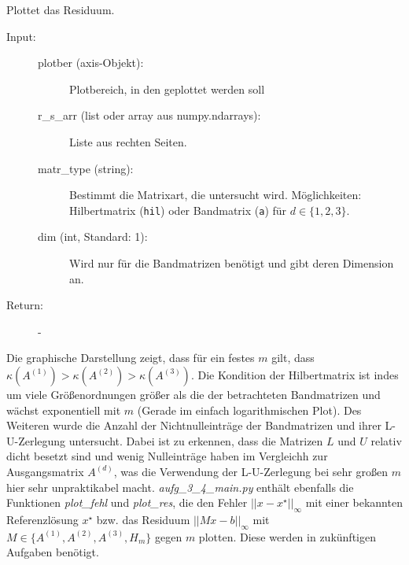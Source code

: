 \documentclass[letterpaper,10pt,ngerman, oneside, openright]{sphinxmanual}
\begin{document}

\begin{fulllineitems}
\label{\detokenize{index:aufg_3_4_main.plot_res}}
Plottet das  Residuum.
\begin{description}
\item[{Input:}] \leavevmode\begin{description}
\item[{plotber (axis-Objekt):}] \leavevmode
Plotbereich, in den geplottet werden soll

\item[{r\_s\_arr (list oder array aus numpy.ndarrays):}] \leavevmode
Liste aus rechten Seiten.

\item[{matr\_type (string):}] \leavevmode
Bestimmt die Matrixart, die untersucht wird.
Möglichkeiten: Hilbertmatrix (\texttt{hil}) oder
Bandmatrix (\texttt{a}) für $d\in\{1,2,3\}$.

\item[{dim (int, Standard: 1):}] \leavevmode
Wird nur für die Bandmatrizen benötigt und gibt deren Dimension an.

\end{description}

\end{description}
\begin{description}
\item [{Return:}] -
\end{description}
\end{fulllineitems}






Die graphische Darstellung zeigt, dass für ein festes $m$ gilt, dass $\kappa(A^{(1)})>\kappa(A^{(2)})>\kappa(A^{(3)})$. Die Kondition der Hilbertmatrix ist indes um viele Größenordnungen größer als die der betrachteten Bandmatrizen und wächst exponentiell mit $m$ (Gerade im einfach logarithmischen Plot). Des Weiteren wurde die Anzahl der Nichtnulleinträge der Bandmatrizen und ihrer L-U-Zerlegung untersucht. Dabei ist zu erkennen, dass die Matrizen $L$ und $U$ relativ dicht besetzt sind und wenig Nulleinträge haben im Vergleichh zur Ausgangsmatrix $A^{(d)}$, was die Verwendung der L-U-Zerlegung bei sehr großen $m$ hier sehr unpraktikabel macht. \textit{aufg\_3\_4\_main.py}  enthält ebenfalls die Funktionen \textit{plot\_fehl} und \textit{plot\_res}, die den Fehler $|\lvert x-x^\star|\rvert_\infty$ mit einer bekannten Referenzlösung $x^\star$ bzw. das Residuum $|\lvert Mx-b|\rvert_\infty$ mit $M\in \{A^{(1)},A^{(2)},A^{(3)}, H_m\}$ gegen $m$ plotten. Diese werden in zukünftigen Aufgaben benötigt.





\end{document}
